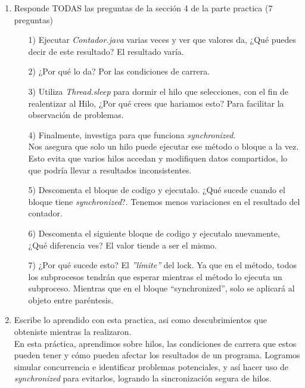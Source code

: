 \documentclass[12pt]{extarticle} %
\begin{document}
\begin{enumerate}
    \item Responde TODAS las preguntas de la sección 4 de la parte practica (7 preguntas)
    \begin{enumerate}
        \item[1)] Ejecutar \textit{Contador.java} varias veces y ver que valores da, ¿Qué puedes decir de este resultado? El resultado varía.
        \item[2)] ¿Por qué lo da? Por las condiciones de carrera.
        \item[3)] Utiliza \textit{Thread.sleep} para dormir el hilo que selecciones, con el fin de realentizar al Hilo, ¿Por qué crees que hariamos esto? Para facilitar la observación de problemas.
        \item[4)] Finalmente, investiga para que funciona \textit{synchronized}. \\ Nos asegura que solo un hilo puede ejecutar ese método o bloque a la vez. Esto evita que varios hilos accedan y modifiquen datos compartidos, lo que podría llevar a resultados inconsistentes.
        \item[5)] Descomenta el bloque de codigo y ejecutalo. ¿Qué sucede cuando el bloque tiene \textit{synchronized}?. Tenemos menos variaciones en el resultado del contador. 
        \item[6)] Descomenta el siguiente bloque de codigo y ejecutalo nuevamente, ¿Qué diferencia ves? 
        El valor tiende a ser el mismo.
        \item[7)] ¿Por qué sucede esto? El \textit{''límite''} del lock. Ya que en el método, todos los subprocesos tendrán que esperar mientras el método lo ejecuta un subproceso. Mientras que en el bloque ``synchronized'', solo se aplicará al objeto entre paréntesis.
    \end{enumerate}
    \item Escribe lo aprendido con esta practica, asi como descubrimientos que obteniste mientras la realizaron.\\
En esta práctica, aprendimos sobre hilos, las condiciones de carrera que estos pueden tener y cómo pueden afectar los resultados de un programa. Logramos simular concurrencia e identificar problemas potenciales, y así hacer uso de \textit{synchronized} para evitarlos, logrando la sincronización segura de hilos. 
    
\end{enumerate}

\newpage
\end{document}
